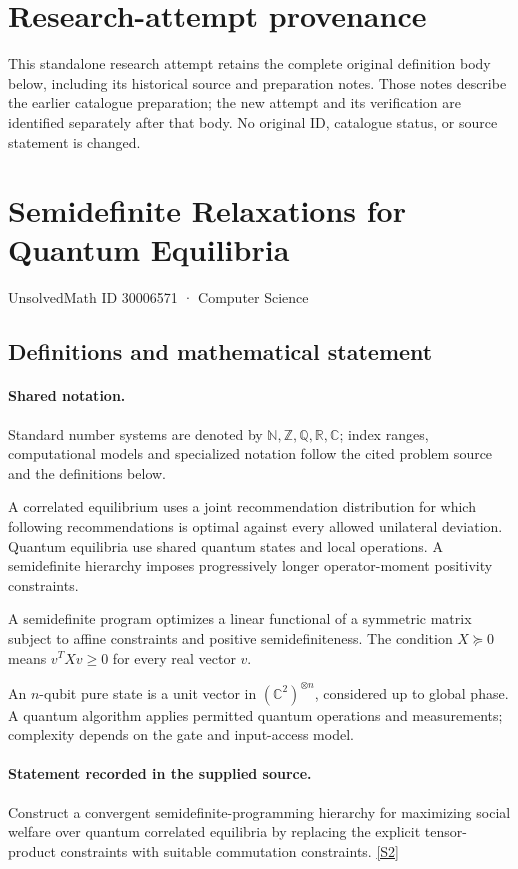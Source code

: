 \documentclass[11pt]{article}
\begin{document}
\section*{Research-attempt provenance}
This standalone research attempt retains the complete original definition body below,
including its historical source and preparation notes. Those notes describe the
earlier catalogue preparation; the new attempt and its verification are identified
separately after that body. No original ID, catalogue status, or source statement is changed.

\section{Semidefinite Relaxations for Quantum Equilibria}\label{30006571}
{\small UnsolvedMath ID 30006571 · Computer Science}
\subsection{Definitions and mathematical statement}

\paragraph{Shared notation.}Standard number systems are denoted by $\mathbb N,\mathbb Z,\mathbb Q,\mathbb R,\mathbb C$; index ranges, computational models and specialized notation follow the cited problem source and the definitions below.


A correlated equilibrium uses a joint recommendation distribution for which following recommendations is optimal against every allowed unilateral deviation. Quantum equilibria use shared quantum states and local operations. A semidefinite hierarchy imposes progressively longer operator-moment positivity constraints.

A semidefinite program optimizes a linear functional of a symmetric matrix subject to affine constraints and positive semidefiniteness. The condition $X\succeq0$ means $v^TXv\geq0$ for every real vector $v$.

An $n$-qubit pure state is a unit vector in $(\mathbb C^2)^{\otimes n}$, considered up to global phase. A quantum algorithm applies permitted quantum operations and measurements; complexity depends on the gate and input-access model.
\paragraph{Statement recorded in the supplied source.}
Construct a convergent semidefinite-programming hierarchy for maximizing social welfare over quantum correlated equilibria by replacing the explicit tensor-product constraints with suitable commutation constraints. \href{https://doi.org/10.4171/owr/2026/4}{[S2]}
\end{document}
